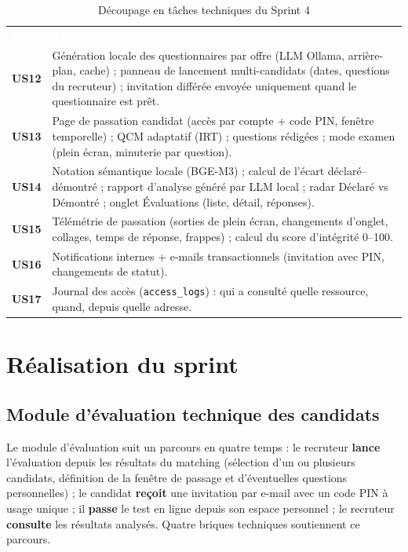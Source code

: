 \documentclass[12pt,a4paper]{report}
\begin{document}
\begin{table}[H]
\centering
\caption{Découpage en tâches techniques du Sprint 4}
\label{tab:taches-s4}
\small
\begin{tabularx}{\textwidth}{>{\bfseries}p{1.2cm} X}
\rowcolor{tabheader}
\textcolor{white}{\textbf{US}} & \textcolor{white}{\textbf{Tâches techniques}} \\
US12 & Génération locale des questionnaires par offre (LLM Ollama, arrière-plan, cache) ; panneau de lancement multi-candidats (dates, questions du recruteur) ; invitation différée envoyée uniquement quand le questionnaire est prêt. \\
\rowcolor{tabalt}
US13 & Page de passation candidat (accès par compte + code PIN, fenêtre temporelle) ; QCM adaptatif (IRT) ; questions rédigées ; mode examen (plein écran, minuterie par question). \\
US14 & Notation sémantique locale (BGE-M3) ; calcul de l'écart déclaré--démontré ; rapport d'analyse généré par LLM local ; radar Déclaré vs Démontré ; onglet Évaluations (liste, détail, réponses). \\
\rowcolor{tabalt}
US15 & Télémétrie de passation (sorties de plein écran, changements d'onglet, collages, temps de réponse, frappes) ; calcul du score d'intégrité 0--100. \\
US16 & Notifications internes + e-mails transactionnels (invitation avec PIN, changements de statut). \\
\rowcolor{tabalt}
US17 & Journal des accès (\texttt{access\_logs}) : qui a consulté quelle ressource, quand, depuis quelle adresse. \\
\bottomrule
\end{tabularx}
\end{table}

\section{Réalisation du sprint}

\subsection{Module d'évaluation technique des candidats}

Le module d'évaluation suit un parcours en quatre temps : le recruteur \textbf{lance} l'évaluation depuis les résultats du matching (sélection d'un ou plusieurs candidats, définition de la fenêtre de passage et d'éventuelles questions personnelles) ; le candidat \textbf{reçoit} une invitation par e-mail avec un code PIN à usage unique ; il \textbf{passe} le test en ligne depuis son espace personnel ; le recruteur \textbf{consulte} les résultats analysés. Quatre briques techniques soutiennent ce parcours.
\end{document}
